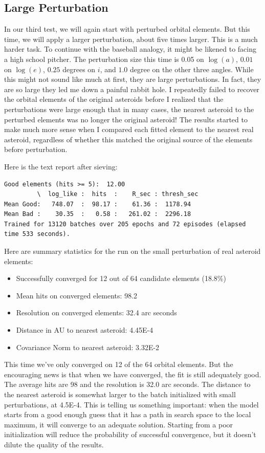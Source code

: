 \subsection{Large Perturbation}
In our third test, we will again start with perturbed orbital elements.
But this time, we will apply a larger perturbation, about five times larger.
This is a much harder task.  
To continue with the baseball analogy, it might be likened to facing a high school pitcher.
The perturbation size this time is 0.05 on $\log(a)$, $0.01$ on $\log(e)$, $0.25$ degrees on $i$, and $1.0$ degree on the other three angles.
While this might not sound like much at first, they are large perturbations.
In fact, they are so large they led me down a painful rabbit hole.
I repeatedly failed to recover the orbital elements of the original asteroids 
before I realized that the perturbations were large enough that in many cases, 
the nearest asteroid to the perturbed elements was no longer the original asteroid!
The results started to make much more sense when I compared each fitted element to the nearest real asteroid,
regardless of whether this matched the original source of the elements before perturbation.

Here is the text report after sieving:
\begin{lstlisting}[style=CodeSnippet]
Good elements (hits >= 5):  12.00
         \  log_like :  hits  :    R_sec : thresh_sec
Mean Good:   748.07  :  98.17 :    61.36 :  1178.94
Mean Bad :    30.35  :   0.58 :   261.02 :  2296.18
Trained for 13120 batches over 205 epochs and 72 episodes (elapsed time 533 seconds).
\end{lstlisting}

Here are summary statistics for the run on the small perturbation of real asteroid elements:
\begin{itemize}
\item Successfully converged for 12 out of 64 candidate elements (18.8\%)
\item Mean hits on converged elements: 98.2
\item Resolution on converged elements: 32.4 arc seconds
\item Distance in AU to nearest asteroid: 4.45E-4
\item Covariance Norm to nearest asteroid: 3.32E-2
\end{itemize}
This time we've only converged on 12 of the 64 orbital elements.
But the encouraging news is that when we have converged, the fit is still adequately good.
The average hits are 98 and the resolution is 32.0 arc seconds.
The distance to the nearest asteroid is somewhat larger to the batch initialized with small perturbations, at 4.5E-4.
This is telling us something important: 
when the model starts from a good enough guess that it has a path in search space to the local maximum, it will converge to an adequate solution.
Starting from a poor initialization will reduce the probability of successful convergence, but it doesn't dilute the quality of the results.

